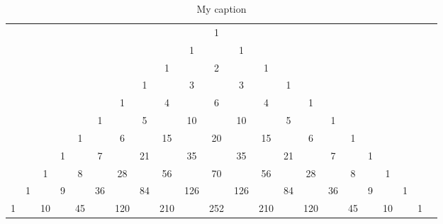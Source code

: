 \begin{table}
\begin{center}
\small\addtolength{\tabcolsep}{-5pt}
\begin{tabular}{cccccccccccccccccccccc}
   &    &    &    &    &    &    &    &    &    &  1\\
   &    &    &    &    &    &    &    &    &  1 &    &  1\\
   &    &    &    &    &    &    &    &  1 &    &  2 &    &  1\\
   &    &    &    &    &    &    &  1 &    &  3 &    &  3 &    &  1\\
   &    &    &    &    &    &  1 &    &  4 &    &  6 &    &  4 &    &  1\\
   &    &    &    &    &  1 &    &  5 &    & 10 &    & 10 &    &  5 &    &  1\\
   &    &    &    &  1 &    &  6 &    & 15 &    & 20 &    & 15 &    &  6 &    &  1\\
   &    &    &  1 &    &  7 &    & 21 &    & 35 &    & 35 &    & 21 &    &  7 &    &  1\\
   &    &  1 &    &  8 &    & 28 &    & 56 &    & 70 &    & 56 &    & 28 &    &  8 &    &  1\\
   &  1 &    &  9 &    & 36 &    & 84 &    & 126 &    & 126 &    & 84 &    & 36 &    &  9 &    &  1\\
 1 &    & 10 &    & 45 &    & 120 &    & 210 &    & 252 &    & 210 &    & 120 &    & 45 &    & 10 &    &  1\\
\end{tabular}
\end{center}
\caption{My caption} \label{tab:mytab}
\end{table}
